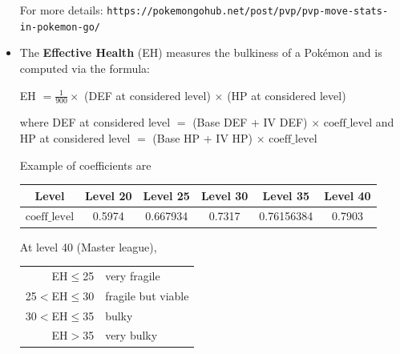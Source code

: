\documentclass[8pt,aspectratio=169,compress]{beamer}
\begin{document}
\begin{frame}
\begin{block}{}
\begin{tiny}
\begin{itemize}
 For more details: \texttt{https://pokemongohub.net/post/pvp/pvp-move-stats-in-pokemon-go/}
 
 \item The \textbf{Effective Health} (EH) measures the bulkiness of a Pok\'emon and is computed via the formula:
\begin{center}
EH $= \frac{1}{900} \times$ (DEF at considered level) $\times$ (HP at considered level) 
\end{center}

where DEF at considered level $=$ (Base DEF + IV DEF) $\times$ $\text{coeff}\_\text{level}$ and HP at considered level $=$ (Base HP + IV HP) $\times$ $\text{coeff}\_\text{level}$

Example of coefficients are

\begin{center}
\begin{tabular}{cccccc} 
Level &   Level 20 &  Level 25 &  Level 30 &  Level 35 &  Level 40 \\ \hline
$\text{coeff}\_\text{level}$ &   0.5974 & 0.667934 & 0.7317 & 0.76156384 & 0.7903 \\
\end{tabular}   
\end{center}

At level 40 (Master league),

\begin{center}
\begin{tabular}{rl}
EH$\leq$25  & very fragile \\
25$<$EH$\leq$30  & fragile but viable \\
30$<$EH$\leq$35  & bulky \\
EH$>$35  & very bulky \\
\end{tabular}
\end{center}

\end{itemize}
\end{tiny}
\end{block}
\end{frame}
\end{document}
